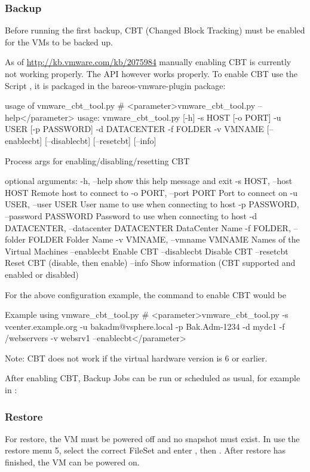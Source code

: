 \subsubsection{Backup}

Before running the first backup, CBT (Changed Block Tracking) must be
enabled for the VMs to be backed up.

As of \url{http://kb.vmware.com/kb/2075984} manually enabling CBT is
currently not working properly. The API however works properly.
To enable CBT use the Script , it is packaged
in the bareos-vmware-plugin package:

\begin{commands}{usage of vmware\_cbt\_tool.py}
# <parameter>vmware_cbt_tool.py --help</parameter>
usage: vmware_cbt_tool.py [-h] -s HOST [-o PORT] -u USER [-p PASSWORD] -d
                          DATACENTER -f FOLDER -v VMNAME [--enablecbt]
                          [--disablecbt] [--resetcbt] [--info]

Process args for enabling/disabling/resetting CBT

optional arguments:
  -h, --help            show this help message and exit
  -s HOST, --host HOST  Remote host to connect to
  -o PORT, --port PORT  Port to connect on
  -u USER, --user USER  User name to use when connecting to host
  -p PASSWORD, --password PASSWORD
                        Password to use when connecting to host
  -d DATACENTER, --datacenter DATACENTER
                        DataCenter Name
  -f FOLDER, --folder FOLDER
                        Folder Name
  -v VMNAME, --vmname VMNAME
                        Names of the Virtual Machines
  --enablecbt           Enable CBT
  --disablecbt          Disable CBT
  --resetcbt            Reset CBT (disable, then enable)
  --info                Show information (CBT supported and enabled or
                        disabled)
\end{commands}

For the above configuration example, the command to enable CBT would be

\begin{commands}{Example using vmware\_cbt\_tool.py}
# <parameter>vmware_cbt_tool.py -s vcenter.example.org -u bakadm@vsphere.local -p Bak.Adm-1234 -d mydc1 -f /webservers -v websrv1 --enablecbt</parameter>
\end{commands}

Note: CBT does not work if the virtual hardware version is 6 or earlier.

After enabling CBT, Backup Jobs can be run or scheduled as usual,
for example in :


\subsubsection{Restore}

For restore, the VM must be powered off and no snapshot must exist.
In  use the restore menu 5, select the correct FileSet
and enter , then . After restore has finished,
the VM can be powered on.
